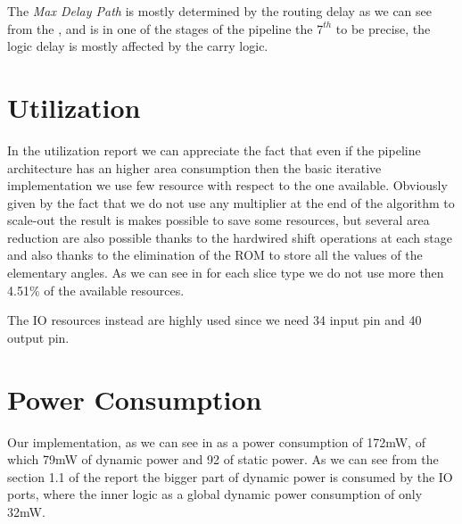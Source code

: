 The \emph{Max Delay Path} is mostly determined by the routing delay as we can 
see from the , and is in one of the stages of the pipeline 
the \(7^{th}\) to be precise, the logic delay is mostly affected by the carry
logic.

    

\section{Utilization}
In the utilization report we can appreciate the fact that even if the pipeline
architecture has an higher area consumption then the basic iterative
implementation we use few resource with respect to the one available. Obviously
given by the fact that we do not use any multiplier at the end of the algorithm 
to scale-out the result is makes possible to save some resources,
but several area reduction are also possible thanks to the hardwired shift
operations at each stage and also thanks to the elimination of the ROM to store
all the values of the elementary angles. As we can see in 
for each slice type we do not use more then 4.51\% of the available resources.

The IO resources instead are highly used since we need 34 input pin  and 40 
output pin.
    

\section{Power Consumption}
Our implementation, as we can see in  as a power consumption
of 172mW, of which 79mW of dynamic power and 92 of static power. As we can see
from the section 1.1 of the report the bigger part of dynamic power is consumed
by the IO ports, where the inner logic as a global dynamic power consumption of
only 32mW.
    


